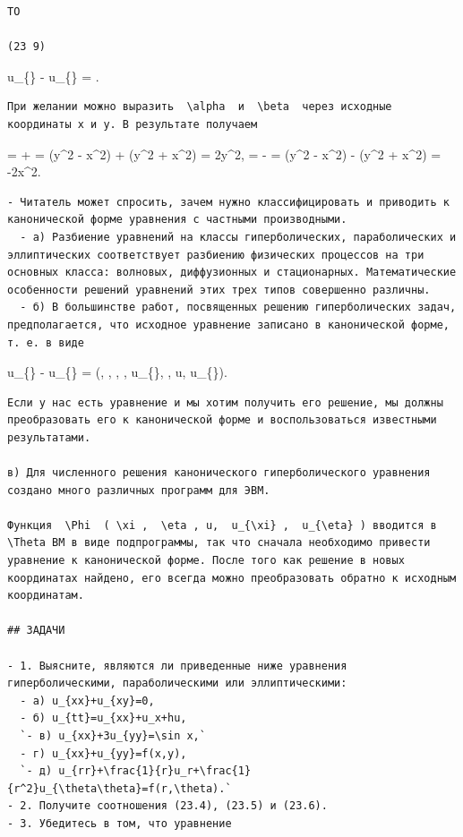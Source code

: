 \documentclass[
  ukrainian,
]{article}
\begin{document}
\begin{verbatim}
TO

(23 9)
\end{verbatim}

u\_\{\alpha\alpha\} - u\_\{\beta\beta\} =
.

\begin{verbatim}
При желании можно выразить  \alpha  и  \beta  через исходные координаты x и y. В результате получаем
\end{verbatim}

\alpha = \xi + \eta = (y\^{}2 - x\^{}2) + (y\^{}2 + x\^{}2) = 2y\^{}2,
\beta = \xi - \eta = (y\^{}2 - x\^{}2) - (y\^{}2 + x\^{}2) = -2x\^{}2.

\begin{verbatim}
- Читатель может спросить, зачем нужно классифицировать и приводить к канонической форме уравнения с частными производными.
  - а) Разбиение уравнений на классы гиперболических, параболических и эллиптических соответствует разбиению физических процессов на три основных класса: волновых, диффузионных и стационарных. Математические особенности решений уравнений этих трех типов совершенно различны.
  - б) В большинстве работ, посвященных решению гиперболических задач, предполагается, что исходное уравнение записано в канонической форме, т. е. в виде
\end{verbatim}

u\_\{\xi\xi\} - u\_\{\eta\eta\} = \Psi(\xi, , \eta, , u\_\{\xi\}, , u,
u\_\{\eta\}).

\begin{verbatim}
Если у нас есть уравнение и мы хотим получить его решение, мы должны преобразовать его к канонической форме и воспользоваться известными результатами.

в) Для численного решения канонического гиперболического уравнения создано много различных программ для ЭВМ.

Функция  \Phi  ( \xi ,  \eta , u,  u_{\xi} ,  u_{\eta} ) вводится в  \Theta ВМ в виде подпрограммы, так что сначала необходимо привести уравнение к канонической форме. После того как решение в новых координатах найдено, его всегда можно преобразовать обратно к исходным координатам.

## ЗАДАЧИ

- 1. Выясните, являются ли приведенные ниже уравнения гиперболическими, параболическими или эллиптическими:
  - a) u_{xx}+u_{xy}=0,
  - б) u_{tt}=u_{xx}+u_x+hu,
  `- в) u_{xx}+3u_{yy}=\sin x,`
  - г) u_{xx}+u_{yy}=f(x,y),
  `- д) u_{rr}+\frac{1}{r}u_r+\frac{1}{r^2}u_{\theta\theta}=f(r,\theta).`
- 2. Получите соотношения (23.4), (23.5) и (23.6).
- 3. Убедитесь в том, что уравнение
\end{verbatim}
\end{document}
